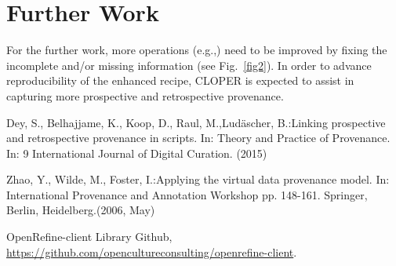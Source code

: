 \documentclass[runningheads]{llncs}
\begin{document}
\section{Further Work}
For the further work, more operations (e.g.,) need to be improved by fixing the incomplete and/or missing information (see Fig.~\ref{fig2}). In order to advance reproducibility of the enhanced recipe, CLOPER is expected to assist in capturing more prospective and retrospective provenance. 

\begin{thebibliography}{8}

Dey, S., Belhajjame, K., Koop, D., Raul, M.,Lud\"ascher, B.:Linking prospective and retrospective provenance in scripts. In: Theory and Practice of Provenance. In: 9 International Journal of Digital Curation. (2015)

Zhao, Y., Wilde, M., Foster, I.:Applying the virtual data provenance model. In: International Provenance and Annotation Workshop pp. 148-161. Springer, Berlin, Heidelberg.(2006, May)

OpenRefine-client Library Github, \url{https://github.com/opencultureconsulting/openrefine-client}. 


\end{thebibliography}
\end{document}
